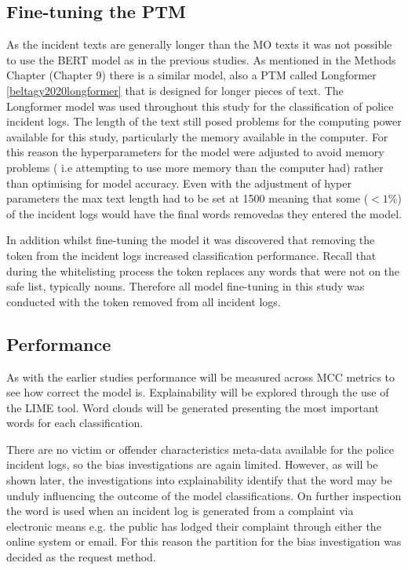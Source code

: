 \subsection{Fine-tuning the PTM} As the incident texts are generally longer than the MO texts it was not possible to use the BERT model as in the previous studies. As mentioned in the Methods Chapter (Chapter 9) there is a similar model, also a PTM called Longformer \ref{beltagy2020longformer}  that is designed for longer pieces of text. The Longformer model was used throughout this study for the classification of police incident logs. The length of the text still posed problems for the computing power available for this study, particularly the memory available in the computer. For this reason the hyperparameters for the model were adjusted to avoid memory problems ( i.e attempting to use more memory than the computer had) rather than optimising for model accuracy. Even with the adjustment of hyper parameters the max text length had to be set at 1500 meaning that some ($<1\%$) of the incident logs would have the final words removedas they entered the model.

In addition whilst fine-tuning the model it was discovered that removing the  token from the incident logs increased classification performance. Recall that during the whitelisting process the  token replaces any words that were not on the safe list, typically nouns. Therefore all model fine-tuning in this study was conducted with the  token removed from all incident logs. 

\subsection{Performance} As with the earlier studies performance will be measured across MCC metrics to see how correct the model is. Explainability will be explored through the use of the LIME tool.  Word clouds will be generated presenting the most important words for each classification. 

There are no victim or offender characteristics meta-data  available for the police incident logs, so the bias investigations are again limited. However, as will be shown later,  the investigations into explainability identify that the word  may be unduly influencing the outcome of the model classifications. On further inspection the word  is used when an incident log is generated from a complaint via electronic means e.g. the public has lodged their complaint through either the online system or email. For this reason the partition for the bias investigation was decided as the request method. 

